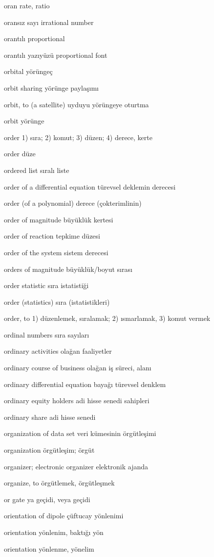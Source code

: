 \documentclass[12pt,fleqn]{article}\usepackage{../../common}
\begin{document}
oran rate, ratio

oransız sayı irrational number

orantılı proportional

orantılı yazıyüzü proportional font

orbital yörüngeç

orbit sharing yörünge paylaşımı

orbit, to (a satellite) uyduyu yörüngeye oturtma

orbit yörünge

order 1) sıra; 2) komut; 3) düzen; 4) derece, kerte

order düze

ordered list sıralı liste

order of a differential equation türevsel deklemin derecesi

order (of a polynomial) derece (çokterimlinin)

order of magnitude büyüklük kertesi

order of reaction tepkime düzesi

order of the system sistem derecesi

orders of magnitude büyüklük/boyut sırası

order statistic sıra istatistiği

order (statistics) sıra (istatistikleri)

order, to 1) düzenlemek, sıralamak; 2) ısmarlamak, 3) komut vermek

ordinal numbers sıra sayıları

ordinary activities olağan faaliyetler

ordinary course of business olağan iş süreci, alanı

ordinary differential equation bayağı türevsel denklem

ordinary equity holders adi hisse senedi sahipleri

ordinary share adi hisse senedi

organization of data set veri kümesinin örgütleşimi

organization örgütleşim; örgüt

organizer; electronic organizer elektronik ajanda

organize, to örgütlemek, örgütleşmek

or gate ya geçidi, veya geçidi

orientation of dipole çüftucay yönlenimi

orientation yönlenim, baktığı yön

orientation yönlenme, yönelim
\end{document}

